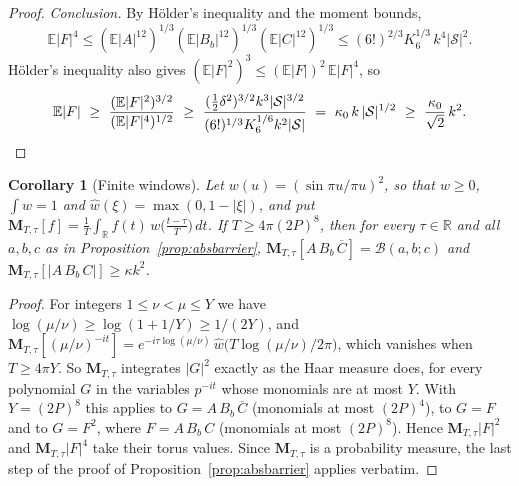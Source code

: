 \documentclass[11pt]{amsart}
\newtheorem{corollary}[theorem]{Corollary}
\theoremstyle{definition}
\theoremstyle{remark}
\begin{document}
\begin{proof}
\emph{Conclusion.} By Hölder's inequality and the moment bounds,
\[
\mathbb E|F|^4\le(\mathbb E|A|^{12})^{1/3}(\mathbb E|B_b|^{12})^{1/3}(\mathbb E|C|^{12})^{1/3}\le(6!)^{2/3}K_6^{1/3}\,k^4|\mathcal S|^2 .
\]
Hölder's inequality also gives $(\mathbb E|F|^2)^3\le(\mathbb E|F|)^2\,\mathbb E|F|^4$, so
\[
\mathbb E|F|\ \ge\ \frac{(\mathbb E|F|^2)^{3/2}}{(\mathbb E|F|^4)^{1/2}}\ \ge\ \frac{(\frac12\delta^2)^{3/2}k^3|\mathcal S|^{3/2}}{(6!)^{1/3}K_6^{1/6}k^2|\mathcal S|}\ =\ \kappa_0\,k\,|\mathcal S|^{1/2}\ \ge\ \frac{\kappa_0}{\sqrt2}\,k^2 .\qedhere
\]
\end{proof}


\begin{corollary}[Finite windows]\label{cor:absbarrierT}
Let $w(u)=(\sin\pi u/\pi u)^2$, so that $w\ge0$, $\int w=1$ and $\hat w(\xi)=\max(0,1-|\xi|)$, and put $\mathbf M_{T,\tau}[f]=\frac1T\int_{\mathbb R}f(t)\,w\bigl(\frac{t-\tau}T\bigr)\,dt$. If $T\ge4\pi(2P)^8$, then for every $\tau\in\mathbb R$ and all $a,b,c$ as in Proposition~\ref{prop:absbarrier}, $\mathbf M_{T,\tau}[A\,B_b\,\overline C]=\mathcal B(a,b;c)$ and $\mathbf M_{T,\tau}[|A\,B_b\,C|]\ge\kappa k^2$.
\end{corollary}
\begin{proof}
For integers $1\le\nu<\mu\le Y$ we have $\log(\mu/\nu)\ge\log(1+1/Y)\ge1/(2Y)$, and $\mathbf M_{T,\tau}[(\mu/\nu)^{-it}]=e^{-i\tau\log(\mu/\nu)}\,\hat w\bigl(T\log(\mu/\nu)/2\pi\bigr)$, which vanishes when $T\ge4\pi Y$. So $\mathbf M_{T,\tau}$ integrates $|G|^2$ exactly as the Haar measure does, for every polynomial $G$ in the variables $p^{-it}$ whose monomials are at most $Y$. With $Y=(2P)^8$ this applies to $G=A\,B_b\,\overline C$ (monomials at most $(2P)^4$), to $G=F$ and to $G=F^2$, where $F=A\,B_b\,C$ (monomials at most $(2P)^8$). Hence $\mathbf M_{T,\tau}|F|^2$ and $\mathbf M_{T,\tau}|F|^4$ take their torus values. Since $\mathbf M_{T,\tau}$ is a probability measure, the last step of the proof of Proposition~\ref{prop:absbarrier} applies verbatim.
\end{proof}
\end{document}
